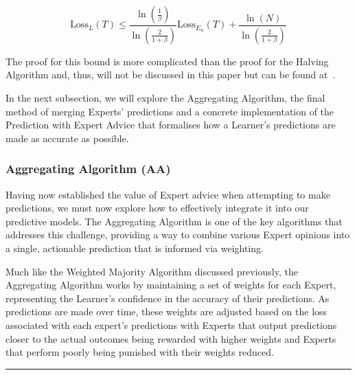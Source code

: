 \begin{equation}
    \text{Loss}_L(T) \leq \frac{\ln (\frac{1}{\beta})}{\ln (\frac{2}{1 + \beta})} \text{Loss}_{E_n}(T) + \frac{\ln(N)}{\ln(\frac{2}{1+\beta})}
\end{equation}

The proof for this bound is more complicated than the proof for the Halving Algorithm and, thus, will not be discussed in this paper but can be found at~\cite{littlestone:1994}.

In the next subsection, we will explore the Aggregating Algorithm, the final method of merging Experts' predictions and a concrete implementation of the Prediction with Expert Advice that formalises how a Learner's predictions are made as accurate as possible.

\subsubsection{Aggregating Algorithm (AA)}\label{subsubsection:aggregating_algorithm}
Having now established the value of Expert advice when attempting to make predictions, we must now explore how to effectively integrate it into our predictive models. The Aggregating Algorithm is one of the key algorithms that addresses this challenge, providing a way to combine various Expert opinions into a single, actionable prediction that is informed via weighting.

Much like the Weighted Majority Algorithm discussed previously, the Aggregating Algorithm works by maintaining a set of weights for each Expert, representing the Learner's confidence in the accuracy of their predictions. As predictions are made over time, these weights are adjusted based on the loss associated with each expert's predictions with Experts that output predictions closer to the actual outcomes being rewarded with higher weights and Experts that perform poorly being punished with their weights reduced.

\noindent\rule{\textwidth}{0.1pt}

